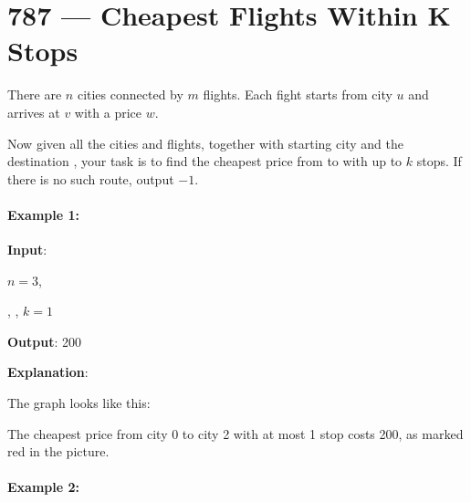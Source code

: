 \section{787 --- Cheapest Flights Within K Stops}
There are $n$ cities connected by $m$ flights. Each fight starts from city $u$ and arrives at $v$ with a price $w$.

Now given all the cities and flights, together with starting city  and the destination , your task is to find the cheapest price from  to  with up to $k$ stops. If there is no such route, output $-1$.

\paragraph{Example 1:}

\begin{flushleft}
\textbf{Input}: 

$n = 3$, 

, , $k = 1$

\textbf{Output}: 200

\textbf{Explanation}: 

The graph looks like this:

\begin{figure}[H]
\end{figure}

The cheapest price from city 0 to city 2 with at most 1 stop costs 200, as marked red in the picture.

\end{flushleft}

\paragraph{Example 2:}

